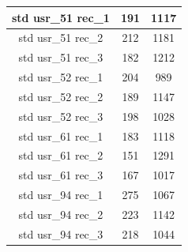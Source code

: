 \begin{table}
\begin{tabular}{|c|c|c|}
        \hline
        std usr\_51 rec\_1 & 191 & 1117 \\
        \hline
        std usr\_51 rec\_2 & 212 & 1181 \\
        \hline
        std usr\_51 rec\_3 & 182 & 1212 \\
        \hline
        std usr\_52 rec\_1 & 204 & 989 \\
        \hline
        std usr\_52 rec\_2 & 189 & 1147 \\
        \hline
        std usr\_52 rec\_3 & 198 & 1028 \\
        \hline
        std usr\_61 rec\_1 & 183 & 1118 \\
        \hline
        std usr\_61 rec\_2 & 151 & 1291 \\
        \hline
        std usr\_61 rec\_3 & 167 & 1017 \\
        \hline
        std usr\_94 rec\_1 & 275 & 1067 \\
        \hline
        std usr\_94 rec\_2 & 223 & 1142 \\
        \hline
        std usr\_94 rec\_3 & 218 & 1044 \\
        \hline
    \end{tabular}
\end{table}